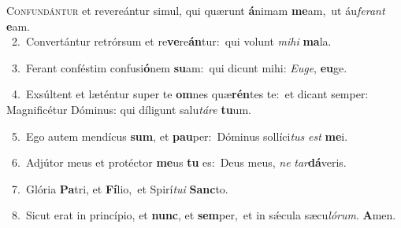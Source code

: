 \lettrine{\initial\textcolor{\initialcolor}{C}}{onfundántur} et revereántur simul, qui quærunt \textbf{á}\-nimam \textbf{me}\-am,~\star ut áu\-\textit{fe}\-\textit{rant} \textbf{e}\-am.\\
{\numbfont\textcolor{\numbcolor}{~2.}}~Convertántur retrórsum et re\-\textbf{ve}\-re\-\textbf{án}\-tur:~\star qui volunt \textit{mi}\-\textit{hi} \textbf{ma}\-la.\par
{\numbfont\textcolor{\numbcolor}{~3.}}~Ferant conféstim confusi\-\textbf{ó}\-nem \textbf{su}\-am:~\star qui dicunt mihi: \textit{Eu}\-\textit{ge}, \textbf{eu}\-ge.\par
{\numbfont\textcolor{\numbcolor}{~4.}}~Exsúltent et læténtur super te \textbf{om}\-nes quæ\-\textbf{rén}\-tes te:~\star et dicant semper: Magnificétur Dóminus: qui díligunt salu\-\textit{tá}\-\textit{re} \textbf{tu}\-um.\par
{\numbfont\textcolor{\numbcolor}{~5.}}~Ego autem mendícus \textbf{sum}\-, et \textbf{pau}\-per:~\star Dóminus sollíci\textit{tus} \textit{est} \textbf{me}\-i.\par
{\numbfont\textcolor{\numbcolor}{~6.}}~Adjútor meus et protéctor \textbf{me}\-us \textbf{tu} es:~\star Deus meus, \textit{ne} \textit{tar}\-\textbf{dá}veris.\par
{\numbfont\textcolor{\numbcolor}{~7.}}~Glória \textbf{Pa}\-tri, et \textbf{Fí}\-lio,~\star et Spirí\-\textit{tu}\-\textit{i} \textbf{Sanc}\-to.\par
{\numbfont\textcolor{\numbcolor}{~8.}}~Sicut erat in princípio, et \textbf{nunc}\-, et \textbf{sem}\-per,~\star et in sǽcula sæcu\-\textit{ló}\-\textit{rum}. \textbf{A}\-men.\par
